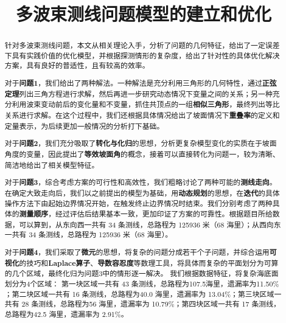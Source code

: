 \documentclass{cumcmthesis}
\title{多波束测线问题模型的建立和优化}
\begin{document}
 \maketitle


 \begin{abstract}
针对多波束测线问题，本文从相关理论入手，分析了问题的几何特征，给出了一定误差下具有实践价值的优化模型，并根据探测情形的复杂度，给出了针对性的具体优化解决方案，具有良好的普适性，且有较高的效率。

对于\textbf{问题1}，我们给出了两种解法。一种解法是充分利用三角形的几何特性，通过\textbf{正弦定理}列出三角方程进行求解，然后再进一步研究动态情况下变量之间的关系；另一种充分利用波束变动前后的变化量和不变量，抓住共顶点的一组\textbf{相似三角形}，最终列出等比关系进行求解。在这个过程中，我们还根据具体情况给出了坡面情况下\textbf{重叠率}的定义和定量表示，为后续更加一般情况的分析打下基础。

对于\textbf{问题2}，我们充分吸取了\textbf{转化与化归}的思想，分析更复杂模型变化的实质在于坡面角度的变量，因此提出了\textbf{等效坡面角}的概念，接着可以直接转化为问题一，较为清晰、简洁地给出了相关模型特征。

对于\textbf{问题3}，综合考虑方案的可行性和高效性，我们粗略讨论了两种可能的\textbf{测线走向}。在确定大致走向后，我们以之前提出的模型为基础，用\textbf{动态规划}的思想，在\textbf{迭代}的具体操作方法下由起始边界情况开始，在触发终止边界情况时结束。我们分别考虑了两种具体的\textbf{测量顺序}，经过评估后结果基本一致，更加印证了方案的可靠性。根据题目所给数据，可以算到，从东向西一共有 34 条测线，总路程为 125936 米（68 海里）；从西向东一共有 34 条测线，总路程为 125936 米（68 海里）。

对于\textbf{问题4}，我们采取了\textbf{微元}的思想，将复杂的问题分成若干个子问题，并综合运用\textbf{可视化}的技巧和\textbf{Laplace算子}、\textbf{导数容忍度}等数理工具，将具体而复杂的平面划分为可算的几个区域，最终化归为问题3中的情形逐一解决。
我们根据数据特征，将复杂海底面划分为4个区域：
第一块区域一共有 43 条测线，总路程为107.5海里，遗漏率为11.50$\%$；第二块区域一共有 16 条测线，总路程为40.0 海里，遗漏率为 13.04$\%$；第三块区域一共有 28 条测线，总路程为56 海里，遗漏率为 10.79$\%$；第四块区域一共有 17 条测线，总路程为42.5 海里，遗漏率为 2.91$\%$。
\\
\\
\end{abstract}


\tableofcontents

\newpage
\end{document}

